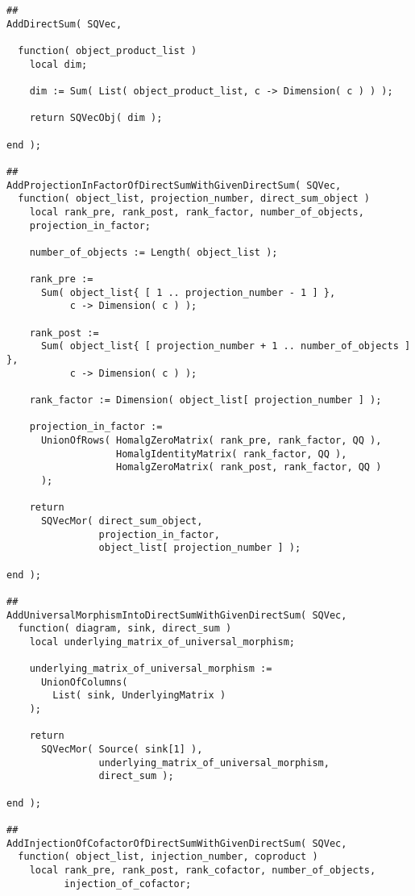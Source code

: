 \begin{small}
\begin{Verbatim}[frame=single]
##
AddDirectSum( SQVec,

  function( object_product_list )
    local dim;
    
    dim := Sum( List( object_product_list, c -> Dimension( c ) ) );
    
    return SQVecObj( dim );
  
end );

##
AddProjectionInFactorOfDirectSumWithGivenDirectSum( SQVec,
  function( object_list, projection_number, direct_sum_object )
    local rank_pre, rank_post, rank_factor, number_of_objects,
    projection_in_factor;
    
    number_of_objects := Length( object_list );
    
    rank_pre := 
      Sum( object_list{ [ 1 .. projection_number - 1 ] },
           c -> Dimension( c ) );
    
    rank_post := 
      Sum( object_list{ [ projection_number + 1 .. number_of_objects ] },
           c -> Dimension( c ) );
    
    rank_factor := Dimension( object_list[ projection_number ] );
    
    projection_in_factor := 
      UnionOfRows( HomalgZeroMatrix( rank_pre, rank_factor, QQ ),
                   HomalgIdentityMatrix( rank_factor, QQ ),
                   HomalgZeroMatrix( rank_post, rank_factor, QQ )
      );
    
    return
      SQVecMor( direct_sum_object,
                projection_in_factor,
                object_list[ projection_number ] );
    
end );

##
AddUniversalMorphismIntoDirectSumWithGivenDirectSum( SQVec,
  function( diagram, sink, direct_sum )
    local underlying_matrix_of_universal_morphism;
    
    underlying_matrix_of_universal_morphism :=
      UnionOfColumns(
        List( sink, UnderlyingMatrix )
    );
    
    return
      SQVecMor( Source( sink[1] ), 
                underlying_matrix_of_universal_morphism, 
                direct_sum );
  
end );

##
AddInjectionOfCofactorOfDirectSumWithGivenDirectSum( SQVec,
  function( object_list, injection_number, coproduct )
    local rank_pre, rank_post, rank_cofactor, number_of_objects,
          injection_of_cofactor;
    

\end{Verbatim}
\end{small}

